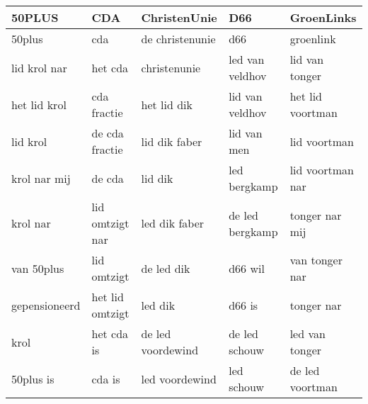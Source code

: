 \begin{tabular}{lllll}
\toprule
        50PLUS &              CDA &       ChristenUnie &              D66 &        GroenLinks \\
\midrule
        50plus &              cda &    de christenunie &              d66 &         groenlink \\
  lid krol nar &          het cda &       christenunie &  led van veldhov &    lid van tonger \\
  het lid krol &      cda fractie &        het lid dik &  lid van veldhov &  het lid voortman \\
      lid krol &   de cda fractie &      lid dik faber &      lid van men &      lid voortman \\
  krol nar mij &           de cda &            lid dik &     led bergkamp &  lid voortman nar \\
      krol nar &  lid omtzigt nar &      led dik faber &  de led bergkamp &    tonger nar mij \\
    van 50plus &      lid omtzigt &         de led dik &          d66 wil &    van tonger nar \\
 gepensioneerd &  het lid omtzigt &            led dik &           d66 is &        tonger nar \\
          krol &       het cda is &  de led voordewind &    de led schouw &    led van tonger \\
     50plus is &           cda is &     led voordewind &       led schouw &   de led voortman \\
\bottomrule
\end{tabular}
